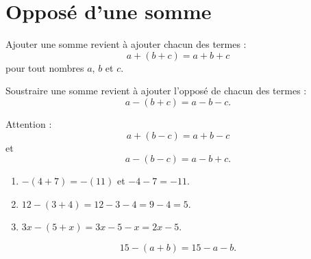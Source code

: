
\section{Opposé d'une somme}





\begin{Aretenir}

    Ajouter une somme revient à ajouter chacun des termes :
    \begin{equation}
        a+(b+c)=a+b+c
    \end{equation}
    pour tout nombres \( a\), \( b\) et \( c\).

    Soustraire une somme revient à ajouter l'opposé de chacun des termes :
    \begin{equation}
        a-(b+c)=a-b-c.
    \end{equation}
\end{Aretenir}

Attention : 
\begin{equation}
        a+(b-c)=a+b-c
\end{equation}
et
\begin{equation}
    a-(b-c)=a-b+c.
\end{equation}


\begin{example}
    \begin{enumerate}
        \item
            \( -(4+7)=-(11)\) et \( -4-7=-11\).
        \item
            \( 12-(3+4)=12-3-4=9-4=5\).
        \item
            \( 3x-(5+x)=3x-5-x=2x-5\).
    \end{enumerate}
\end{example}

\begin{example}
    \begin{equation}
        15-(a+b)=15-a-b.
    \end{equation}
\end{example}

